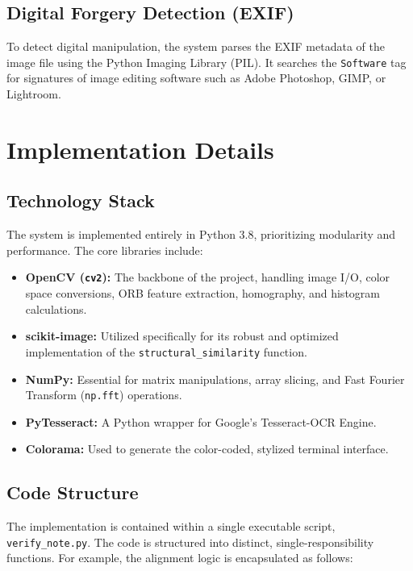 \documentclass[12pt,a4paper]{article}
\begin{document}
\subsection{Digital Forgery Detection (EXIF)}
To detect digital manipulation, the system parses the EXIF metadata of the image file using the Python Imaging Library (PIL). It searches the \texttt{Software} tag for signatures of image editing software such as Adobe Photoshop, GIMP, or Lightroom.

\newpage

\section{Implementation Details}

\subsection{Technology Stack}
The system is implemented entirely in Python 3.8, prioritizing modularity and performance. The core libraries include:
\begin{itemize}
    \item \textbf{OpenCV (\texttt{cv2}):} The backbone of the project, handling image I/O, color space conversions, ORB feature extraction, homography, and histogram calculations.
    \item \textbf{scikit-image:} Utilized specifically for its robust and optimized implementation of the \texttt{structural\_similarity} function.
    \item \textbf{NumPy:} Essential for matrix manipulations, array slicing, and Fast Fourier Transform (\texttt{np.fft}) operations.
    \item \textbf{PyTesseract:} A Python wrapper for Google's Tesseract-OCR Engine.
    \item \textbf{Colorama:} Used to generate the color-coded, stylized terminal interface.
\end{itemize}

\subsection{Code Structure}
The implementation is contained within a single executable script, \texttt{verify\_note.py}. The code is structured into distinct, single-responsibility functions. For example, the alignment logic is encapsulated as follows:
\end{document}
